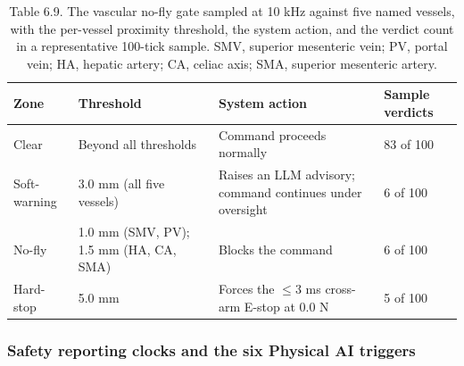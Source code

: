 \begin{table}[t]
\caption{Table 6.9. The vascular no-fly gate sampled at 10 kHz against five named
vessels, with the per-vessel proximity threshold, the system action, and the verdict
count in a representative 100-tick sample. SMV, superior mesenteric vein; PV, portal
vein; HA, hepatic artery; CA, celiac axis; SMA, superior mesenteric artery.}
\label{tab:sec06-vascular}
\centering
\begin{tabularx}{\textwidth}{L{2.4cm} L{4.2cm} Y C{2.0cm}}
\toprule
\textbf{Zone} & \textbf{Threshold} & \textbf{System action} & \textbf{Sample verdicts} \\
\midrule
Clear & Beyond all thresholds & Command proceeds normally & 83 of 100 \\
Soft-warning & 3.0 mm (all five vessels) & Raises an LLM advisory; command continues under oversight & 6 of 100 \\
No-fly & 1.0 mm (SMV, PV); 1.5 mm (HA, CA, SMA) & Blocks the command & 6 of 100 \\
Hard-stop & 5.0 mm & Forces the $\leq 3$ ms cross-arm E-stop at 0.0 N & 5 of 100 \\
\bottomrule
\end{tabularx}
\end{table}

\subsubsection*{Safety reporting clocks and the six Physical AI triggers}

